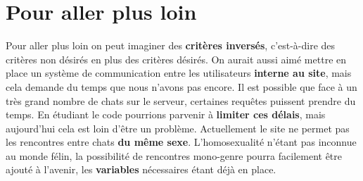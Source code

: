 \documentclass{article}
\begin{document}
\section{Pour aller plus loin}
Pour aller plus loin on peut imaginer des \textbf{critères inversés}, c'est-à-dire des critères non désirés en plus des critères désirés.
\newline
On aurait aussi aimé mettre en place un système de communication entre les utilisateurs \textbf{interne au site}, mais cela demande du temps que nous n'avons pas encore.
\newline
Il est possible que face à un très grand nombre de chats sur le serveur, certaines requêtes puissent prendre du temps. En étudiant le code pourrions parvenir à \textbf{limiter ces délais}, mais aujourd'hui cela est loin d'être un problème.
\newline
Actuellement le site ne permet pas les rencontres entre chats \textbf{du même sexe}. L'homosexualité n'étant pas inconnue au monde félin, la possibilité de rencontres mono-genre pourra facilement être ajouté à l'avenir, les \textbf{variables} nécessaires étant déjà en place.
\end{document}
